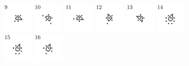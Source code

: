 \documentclass[text.tex]{subfiles}
\begin{document}
\begin{figure}[h!]
\includegraphics[width=0.1363\textwidth]{img/results/octagon_concat/octagon_100000_(1_0alpha_1)_009.pdf}
\includegraphics[width=0.1363\textwidth]{img/results/octagon_concat/octagon_100000_(1_0alpha_1)_010.pdf}
\includegraphics[width=0.1363\textwidth]{img/results/octagon_concat/octagon_100000_(1_0alpha_1)_011.pdf}
\includegraphics[width=0.1363\textwidth]{img/results/octagon_concat/octagon_100000_(1_0alpha_1)_012.pdf}
\includegraphics[width=0.1363\textwidth]{img/results/octagon_concat/octagon_100000_(1_0alpha_1)_013.pdf}
\includegraphics[width=0.1363\textwidth]{img/results/octagon_concat/octagon_100000_(1_0alpha_1)_014.pdf}
\includegraphics[width=0.1363\textwidth]{img/results/octagon_concat/octagon_100000_(1_0alpha_1)_015.pdf}
\includegraphics[width=0.1363\textwidth]{img/results/octagon_concat/octagon_100000_(1_0alpha_1)_016.pdf}

\end{figure}
\end{document}

